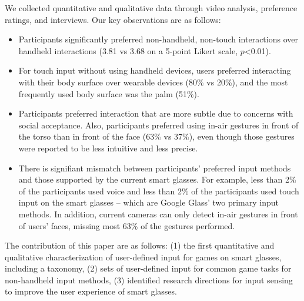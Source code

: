 \documentclass{sigchi}
\begin{document}
We collected quantitative and qualitative data through video analysis, preference ratings, and interviews. 
Our key observations are as follows:
\begin{itemize}
  \item Participants significantly preferred non-handheld, non-touch interactions over handheld interactions (3.81  vs 3.68 on a 5-point Likert scale, $p$\textless 0.01).
  \item For touch input without using handheld devices, users preferred interacting with their body surface over wearable devices (80\% vs 20\%), and the most frequently used body surface was the palm (51\%).
  \item Participants preferred interaction that are more subtle due to concerns with social acceptance. Also, participants preferred using in-air gestures in front of the torso than in front of the face (63\% vs 37\%), even though those gestures were reported to be less intuitive and less precise.
  \item There is signifiant mismatch between participants' preferred input methods and those supported by the current smart glasses. For example, less than 2\% of the participants used voice and less than 2\% of the participants used touch input on the smart glasses -- which are Google Glass' two primary input methods. In addition, current cameras can only detect in-air gestures in front of users' faces, missing most 63\% of the gestures performed.
\end{itemize}


 
The contribution of this paper are as follows:
(1) the first quantitative and qualitative characterization of user-defined input for games on smart glasses, including a taxonomy, 
(2) sets of user-defined input for common game tasks for non-handheld input methods, 
(3) identified research directions for input sensing to improve the user experience of smart glasses.



\end{document}
